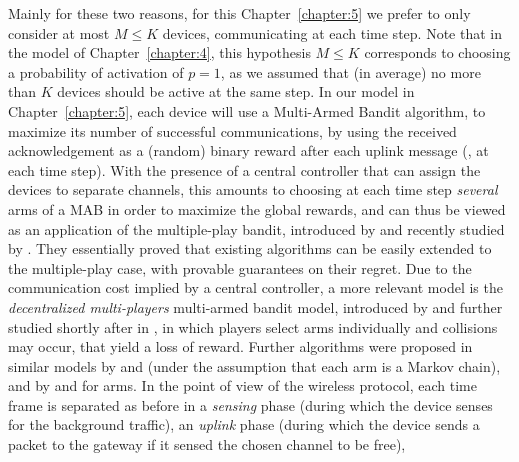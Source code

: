 Mainly for these two reasons, for this Chapter~\ref{chapter:5} we prefer to only consider at most $M \leq K$ devices, communicating at each time step.
Note that in the model of Chapter~\ref{chapter:4}, this hypothesis $M \leq K$ corresponds to choosing a probability of activation of $p=1$, as we assumed that (in average) no more than $K$ devices should be active at the same step.
%
In our model in Chapter~\ref{chapter:5}, each device will use a Multi-Armed Bandit algorithm, to maximize its number of successful communications, by using the received acknowledgement \Ack{} as a (random) binary reward after each uplink message (\ie, at each time step).
%
With the presence of a central controller that can assign the devices to separate channels, this amounts to choosing at each time step \emph{several} arms of a MAB in order to maximize the global rewards, and can thus be viewed as an application of the multiple-play bandit, introduced by \cite{Anantharam87a} and recently studied by \cite{Komiyama15}.
They essentially proved that existing algorithms can be easily extended to the multiple-play case, with provable guarantees on their regret.
%
%
Due to the communication cost implied by a central controller, a more relevant model is the
\emph{decentralized multi-players} multi-armed bandit model, introduced by \cite{Zhao10} and further studied shortly after in \cite{Anandkumar10,Anandkumar11}, in which players select arms individually and collisions may occur, that yield a loss of reward.
Further algorithms were proposed in similar models by \cite{Tekin12IEEE} and \cite{Kalathil12} (under the assumption that each arm is a Markov chain),
and by \cite{Avner15,Avner16} and \cite{Rosenski16} for \iid{} arms.
%
In the point of view of the wireless protocol, each time frame is separated as before in a \emph{sensing} phase (during which the device senses for the background traffic),
an \emph{uplink} phase (during which the device sends a packet to the gateway if it sensed the chosen channel to be free),
